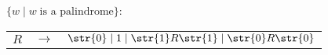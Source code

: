 $\{w \mid w \; \text{is a palindrome}\}$: \par
\begin{tabular}{ccl}
	$R$ & $\rightarrow$ & $\str{0} \mid {1} \mid \str{1}R\str{1} \mid \str{0}R\str{0}$ \\
\end{tabular}